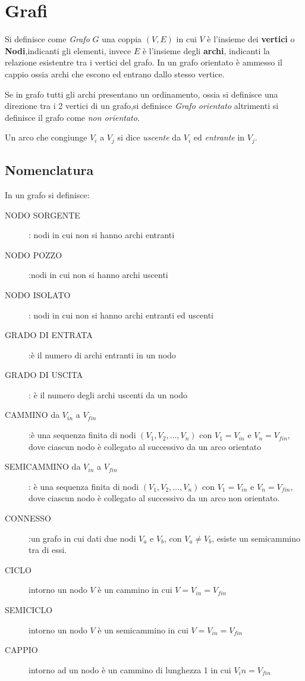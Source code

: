 \section{Grafi}
Si definisce come \emph{Grafo} $G$ una coppia $(V,E)$ in cui $V$ è l'insieme
dei \textbf{vertici} o \textbf{Nodi},indicanti gli elementi, invece $E$
 è l'insieme degli \textbf{archi}, indicanti la relazione esistentre tra i vertici del grafo.\newline
In un grafo orientato è ammesso il cappio ossia archi che escono ed entrano dallo stesso vertice.

Se in grafo tutti gli archi presentano un ordinamento, ossia si definisce una direzione
tra i 2 vertici di un grafo,si definisce \emph{Grafo orientato}
altrimenti si definisce il grafo come \emph{non orientato}.

Un arco che congiunge $V_i$ a $V_j$ si dice \emph{uscente} da $V_i$ ed \emph{entrante} in $V_j$.

\subsection{Nomenclatura}
In un grafo si definisce:
\begin{description}
    \item[NODO SORGENTE]: nodi in cui non si hanno archi entranti
    \item[NODO POZZO]:nodi in cui non si hanno archi uscenti
    \item[NODO ISOLATO]: nodi in cui non si hanno archi entranti ed uscenti
    \item[GRADO DI ENTRATA]:è il numero di archi entranti in un nodo
    \item[GRADO DI USCITA]: è il numero degli archi uscenti da un nodo
    \item[CAMMINO da $V_{in}$ a $V_{fin}$]:è una sequenza finita di nodi $(V_1,V_2,\dots,V_n)$
     con $V_1 = V_{in}$ e $V_n = V_{fin}$, dove ciascun nodo è collegato al successivo da un arco orientato
    \item[SEMICAMMINO da $V_{in}$ a $V_{fin}$]: è una sequenza finita di nodi
     $(V_1,V_2,\dots,V_n)$ con $V_1 = V_{in}$ e $V_n = V_{fin}$, dove ciascun nodo
     è collegato al successivo da un arco non orientato.
    \item[CONNESSO]:un grafo in cui dati due nodi $V_a$ e $V_b$, con $V_a \neq V_b$,
                    esiste un semicammino tra di essi.
    \item[CICLO]intorno un nodo $V$ è un cammino in cui $V = V_{in} = V_{fin}$
    \item[SEMICICLO]intorno un nodo $V$ è un semicammino in cui $V = V_{in} = V_{fin}$
    \item[CAPPIO]intorno ad un nodo è un cammino di lunghezza 1 in cui $V_in = V_{fin}$
\end{description}

